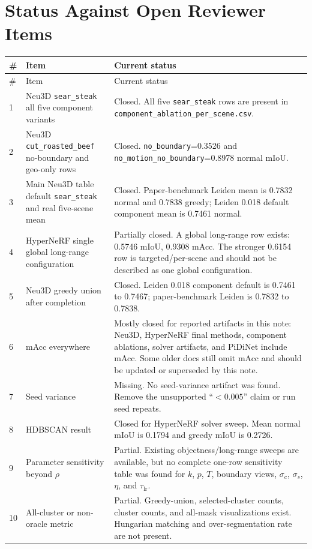 \documentclass[10pt]{article}
\begin{document}
\section{Status Against Open Reviewer Items}
\small
\begin{longtable}{p{0.7cm}p{7.3cm}p{7.0cm}}
\toprule
\# & Item & Current status \\
\midrule
\endfirsthead
\toprule
\# & Item & Current status \\
\midrule
\endhead
1 & Neu3D \texttt{sear\_steak} all five component variants & Closed.  All five \texttt{sear\_steak} rows are present in \texttt{component\_ablation\_per\_scene.csv}. \\
2 & Neu3D \texttt{cut\_roasted\_beef} no-boundary and geo-only rows & Closed.  \texttt{no\_boundary}=0.3526 and \texttt{no\_motion\_no\_boundary}=0.8978 normal mIoU. \\
3 & Main Neu3D table default \texttt{sear\_steak} and real five-scene mean & Closed.  Paper-benchmark Leiden mean is 0.7832 normal and 0.7838 greedy; Leiden 0.018 default component mean is 0.7461 normal. \\
4 & HyperNeRF single global long-range configuration & Partially closed.  A global long-range row exists: 0.5746 mIoU, 0.9308 mAcc.  The stronger 0.6154 row is targeted/per-scene and should not be described as one global configuration. \\
5 & Neu3D greedy union after completion & Closed.  Leiden 0.018 component default is 0.7461 to 0.7467; paper-benchmark Leiden is 0.7832 to 0.7838. \\
6 & mAcc everywhere & Mostly closed for reported artifacts in this note: Neu3D, HyperNeRF final methods, component ablations, solver artifacts, and PiDiNet include mAcc.  Some older docs still omit mAcc and should be updated or superseded by this note. \\
7 & Seed variance & Missing.  No seed-variance artifact was found.  Remove the unsupported ``$<0.005$'' claim or run seed repeats. \\
8 & HDBSCAN result & Closed for HyperNeRF solver sweep.  Mean normal mIoU is 0.1794 and greedy mIoU is 0.2726. \\
9 & Parameter sensitivity beyond $\rho$ & Partial.  Existing objectness/long-range sweeps are available, but no complete one-row sensitivity table was found for $k$, $p$, $T$, boundary views, $\sigma_c$, $\sigma_s$, $\eta$, and $\tau_{\mathrm{lr}}$. \\
10 & All-cluster or non-oracle metric & Partial.  Greedy-union, selected-cluster counts, cluster counts, and all-mask visualizations exist.  Hungarian matching and over-segmentation rate are not present. \\

\end{longtable}
\end{document}
